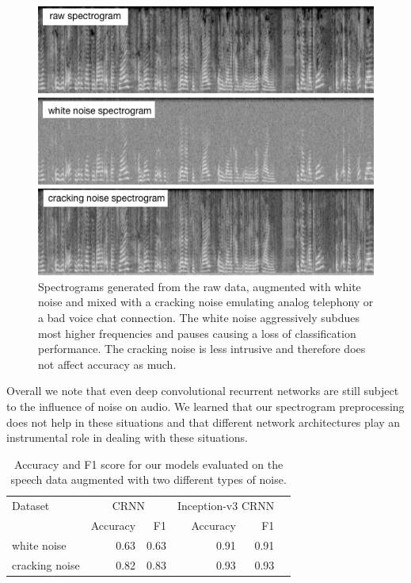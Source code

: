 	\begin{figure}[]
  		\centering
    	\includegraphics[width=\textwidth, keepaspectratio]{img/noise_spectrograms.png}
    	\caption{Spectrograms generated from the raw data, augmented with white noise and mixed with a cracking noise emulating analog telephony or a bad voice chat connection. The white noise aggressively subdues most higher frequencies and pauses causing a loss of classification performance. The cracking noise is less intrusive and therefore does not affect accuracy as much.}
    	\label{fig:noise}
	\end{figure}


Overall we note that even deep convolutional recurrent networks are still subject to the influence of noise on audio. We learned that our spectrogram preprocessing does not help in these situations and that different network architectures play an instrumental role in dealing with these situations.
 
	\begin{table}[]
	\centering
	\begin{tabularx}{\textwidth}{lrrrrr}
	\toprule
	Dataset & \multicolumn{2}{c}{CRNN} & \multicolumn{2}{c}{Inception-v3 CRNN} \\  
                & Accuracy  & F1    & Accuracy  & F1   \\ \midrule
white noise     & 0.63      & 0.63  & 0.91      & 0.91 \\
cracking noise  & 0.82      & 0.83  & 0.93      & 0.93 \\
 	\bottomrule
	\end{tabularx}
	\caption{Accuracy and F1 score for our models evaluated on the speech data augmented with two different types of noise.}
	\label{tab:noise}
	\end{table}



